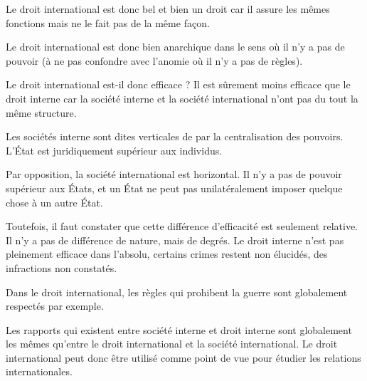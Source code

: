 \documentclass[12pt, a4paper, openany]{book}
\begin{document}
Le droit international est donc bel et bien un droit car il assure les mêmes fonctions mais ne le fait pas de la même façon.

Le droit international est donc bien anarchique dans le sens où il n'y a pas de pouvoir (à ne pas confondre avec l'anomie où il n'y a pas de règles). 


Le droit international est-il donc efficace ? Il est sûrement moins efficace que le droit interne car la société interne et la société international n'ont pas du tout la même structure.

Les sociétés interne sont dites verticales de par la centralisation des pouvoirs. L'État est juridiquement supérieur aux individus. 

Par opposition, la société international est horizontal. Il n'y a pas de pouvoir supérieur aux États, et un État ne peut pas unilatéralement imposer quelque chose à un autre État.

Toutefois, il faut constater que cette différence d'efficacité est seulement relative. Il n'y a pas de différence de nature, mais de degrés. Le droit interne n'est pas pleinement efficace dans l'absolu, certains crimes restent non élucidés, des infractions non constatés.

Dans le droit international, les règles qui prohibent la guerre sont globalement respectés par exemple. 

Les rapports qui existent entre société interne et droit interne sont globalement les mêmes qu'entre le droit international et la société international. Le droit international peut donc être utilisé comme point de vue pour étudier les relations internationales. 
\end{document}
